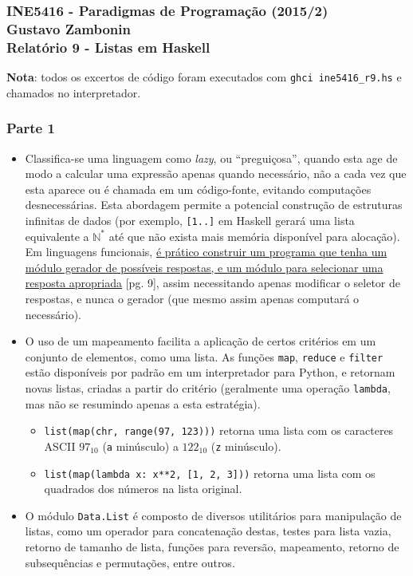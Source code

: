 \documentclass{article}
\begin{document}
\subsubsection*{INE5416 - Paradigmas de Programação (2015/2) \\
    Gustavo Zambonin \\
    Relatório 9 - Listas em Haskell
}

\textbf{Nota}: todos os excertos de código foram executados com
\texttt{ghci ine5416\_r9.hs} e chamados no interpretador.

\subsubsection*{Parte 1}
\begin{itemize}
    \item Classifica-se uma linguagem como \textit{lazy}, ou ``preguiçosa'',
    quando esta age de modo a calcular uma expressão apenas quando necessário,
    não a cada vez que esta aparece ou é chamada em um código-fonte, evitando
    computações desnecessárias. Esta abordagem permite a potencial construção
    de estruturas infinitas de dados (por exemplo, \texttt{[1..]} em Haskell
    gerará uma lista equivalente a $\mathbb{N^{*}}$ até que não exista mais
    memória disponível para alocação). Em linguagens funcionais,
    \href{http://www.cs.kent.ac.uk/people/staff/dat/miranda/whyfp90.pdf}
    {é prático construir um programa que tenha um módulo gerador de possíveis
    respostas, e um módulo para selecionar uma resposta apropriada} [pg. 9],
    assim necessitando apenas modificar o seletor de respostas, e nunca o
    gerador (que mesmo assim apenas computará o necessário).

    \item O uso de um mapeamento facilita a aplicação de certos critérios em
    um conjunto de elementos, como uma lista. As funções \texttt{map},
    \texttt{reduce} e \texttt{filter} estão disponíveis por padrão em um
    interpretador para Python, e retornam novas listas, criadas a partir do
    critério (geralmente uma operação \texttt{lambda}, mas não se resumindo
    apenas a esta estratégia).

    \begin{itemize}
        \item \texttt{list(map(chr, range(97, 123)))} retorna uma lista com os
        caracteres ASCII $97_{10}$ (\texttt{a} minúsculo) a $122_{10}$
        (\texttt{z} minúsculo).

        \item \texttt{list(map(lambda x: x**2, [1, 2, 3]))} retorna uma lista
        com os quadrados dos números na lista original.
    \end{itemize}

    \item O módulo \texttt{Data.List} é composto de diversos utilitários para
    manipulação de listas, como um operador para concatenação destas, testes
    para lista vazia, retorno de tamanho de lista, funções para reversão,
    mapeamento, retorno de subsequências e permutações, entre outros.

\end{itemize}
\end{document}
